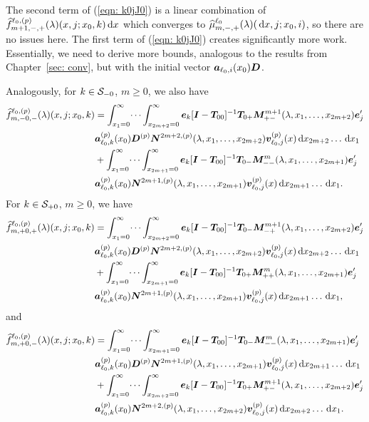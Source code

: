 The second term of (\ref{eqn: k0jJ0}) is a linear combination of \(\widehat{f}_{m+1,-,+}^{\ell_0,(p)}(\lambda)(x,j;x_0,k)\, \mathrm{d} x\) which converges to \(\widehat \mu_{m,-,+}^{\ell_0}(\lambda)(\, \mathrm{d} x,j;x_0,i)\), so there are no issues here. The first term of (\ref{eqn: k0jJ0}) creates significantly more work. Essentially, we need to derive more bounds, analogous to the results from Chapter~\ref{sec: conv}, but with the initial vector \(\boldsymbol a_{\ell_0,i}(x_0)\boldsymbol D\). 

Analogously, for \(k\in\mathcal{S}_{-0}\), \(m\geq 0\), we also have 
\begin{align*}
	\widehat{f}_{m,-0,-}^{\ell_0,(p)}(\lambda)(x,j;x_0,k)\nonumber 
	&=\int_{x_1=0}^\infty \dots \int_{x_{2m+2}=0}^\infty  \boldsymbol e_k [\boldsymbol I - \boldsymbol T_{00}]^{-1}\boldsymbol T_{0+} \boldsymbol M^{m+1}_{+-}(\lambda,x_1,\dots,x_{2m+2})\boldsymbol e_j'{} \nonumber
	\\& \boldsymbol a_{\ell_0,k}^{(p)}(x_0) \boldsymbol D^{(p)} \boldsymbol N^{2m+2,(p)}(\lambda,x_1,\dots,x_{2m+2}) {\boldsymbol v}_{\ell_0,j}^{(p)}(x)\, \mathrm{d} x_{2m+2}\dots  \, \mathrm{d} x_1  \nonumber
	\\& + \int_{x_1=0}^\infty \dots \int_{x_{2m+1}=0}^\infty  \boldsymbol e_k [\boldsymbol I - \boldsymbol T_{00}]^{-1}\boldsymbol T_{0-} \boldsymbol M^{m}_{--}(\lambda,x_1,\dots,x_{2m+1})\boldsymbol e_j'{} \nonumber
	\\& \boldsymbol a_{\ell_0,k}^{(p)}(x_0)\boldsymbol N^{2m+1,(p)}(\lambda,x_1,\dots,x_{2m+1}) {\boldsymbol v}_{\ell_0,j}^{(p)}(x)\, \mathrm{d} x_{2m+1}\dots\, \mathrm{d} x_1.
\end{align*}
For \(k\in\mathcal{S}_{+0}\), \(m\geq 0\), we have 
\begin{align*}
	\widehat{f}_{m,+0,+}^{\ell_0,(p)}(\lambda)(x,j;x_0,k)\nonumber 
	&=\int_{x_1=0}^\infty \dots \int_{x_{2m+2}=0}^\infty \boldsymbol e_k [\boldsymbol I - \boldsymbol T_{00}]^{-1}\boldsymbol T_{0-} \boldsymbol M^{m+1}_{-+}(\lambda,x_1,\dots,x_{2m+2})\boldsymbol e_j'{} \nonumber
	\\& \boldsymbol a_{\ell_0,k}^{(p)}(x_0) \boldsymbol D^{(p)} \boldsymbol N^{2m+2,(p)}(\lambda,x_1,\dots,x_{2m+2}) {\boldsymbol v}_{\ell_0,j}^{(p)}(x)\, \mathrm{d} x_{2m+2}\dots  \, \mathrm{d} x_1  \nonumber
	\\& + \int_{x_1=0}^\infty \dots \int_{x_{2m+1}=0}^\infty  \boldsymbol e_k [\boldsymbol I - \boldsymbol T_{00}]^{-1}\boldsymbol T_{0+} \boldsymbol M^m_{++}(\lambda,x_1,\dots,x_{2m+1})\boldsymbol e_j'{} \nonumber
	\\& \boldsymbol a_{\ell_0,k}^{(p)}(x_0)\boldsymbol N^{2m+1,(p)}(\lambda,x_1,\dots,x_{2m+1}) {\boldsymbol v}_{\ell_0,j}^{(p)}(x)\, \mathrm{d} x_{2m+1}\dots  \, \mathrm{d} x_1,
\end{align*}
and 
\begin{align*}
	\widehat{f}_{m,+0,-}^{\ell_0,(p)}(\lambda)(x,j;x_0,k)\nonumber 
	&=\int_{x_1=0}^\infty \dots \int_{x_{2m+1}=0}^\infty  \boldsymbol e_k [\boldsymbol I - \boldsymbol T_{00}]^{-1}\boldsymbol T_{0-} \boldsymbol M^m_{--}(\lambda,x_1,\dots,x_{2m+1})\boldsymbol e_j'{} \nonumber
	\\& \boldsymbol a_{\ell_0,k}^{(p)}(x_0) \boldsymbol D^{(p)} \boldsymbol N^{2m+1,(p)}(\lambda,x_1,\dots,x_{2m+1}) {\boldsymbol v}_{\ell_0,j}^{(p)}(x)\, \mathrm{d} x_{2m+1}\dots  \, \mathrm{d} x_1  \nonumber
	\\& + \int_{x_1=0}^\infty \dots \int_{x_{2m+2}=0}^\infty  \boldsymbol e_k [\boldsymbol I - \boldsymbol T_{00}]^{-1}\boldsymbol T_{0+} \boldsymbol M^{m+1}_{+-}(\lambda,x_1,\dots,x_{2m+2})\boldsymbol e_j'{} \nonumber
	\\& \boldsymbol a_{\ell_0,k}^{(p)}(x_0)\boldsymbol N^{2m+2,(p)}(\lambda,x_1,\dots,x_{2m+2}) {\boldsymbol v}_{\ell_0,j}^{(p)}(x)\, \mathrm{d} x_{2m+2}\dots  \, \mathrm{d} x_1.
\end{align*}
